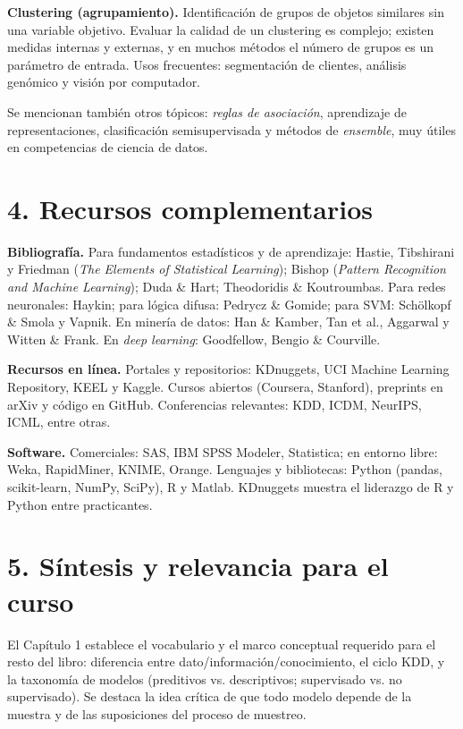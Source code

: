 \documentclass[11pt,a4paper]{article}
\begin{document}
\textbf{Clustering (agrupamiento).} Identificación de grupos de objetos similares sin
una variable objetivo. Evaluar la calidad de un clustering es complejo; existen
medidas internas y externas, y en muchos métodos el número de grupos es un parámetro
de entrada. Usos frecuentes: segmentación de clientes, análisis genómico y visión por
computador.

Se mencionan también otros tópicos: \emph{reglas de asociación}, aprendizaje de
representaciones, clasificación semisupervisada y métodos de \emph{ensemble}, muy
útiles en competencias de ciencia de datos.

\section*{4. Recursos complementarios}

\textbf{Bibliografía.} Para fundamentos estadísticos y de aprendizaje: Hastie,
Tibshirani y Friedman (\emph{The Elements of Statistical Learning}); Bishop (\emph{Pattern
Recognition and Machine Learning}); Duda \& Hart; Theodoridis \& Koutroumbas. Para redes
neuronales: Haykin; para lógica difusa: Pedrycz \& Gomide; para SVM: Schölkopf \& Smola
y Vapnik. En minería de datos: Han \& Kamber, Tan et al., Aggarwal y Witten \& Frank.
En \emph{deep learning}: Goodfellow, Bengio \& Courville.

\textbf{Recursos en línea.} Portales y repositorios: KDnuggets, UCI Machine Learning
Repository, KEEL y Kaggle. Cursos abiertos (Coursera, Stanford), preprints en arXiv y
código en GitHub. Conferencias relevantes: KDD, ICDM, NeurIPS, ICML, entre otras.

\textbf{Software.} Comerciales: SAS, IBM SPSS Modeler, Statistica; en entorno libre:
Weka, RapidMiner, KNIME, Orange. Lenguajes y bibliotecas: Python (pandas,
scikit-learn, NumPy, SciPy), R y Matlab. KDnuggets muestra el liderazgo de R y Python
entre practicantes.

\section*{5. Síntesis y relevancia para el curso}

El Capítulo 1 establece el vocabulario y el marco conceptual requerido para el resto
del libro: diferencia entre dato/información/conocimiento, el ciclo KDD, y la
taxonomía de modelos (preditivos vs. descriptivos; supervisado vs. no supervisado).
Se destaca la idea crítica de que todo modelo depende de la muestra y de las
suposiciones del proceso de muestreo.
\end{document}
